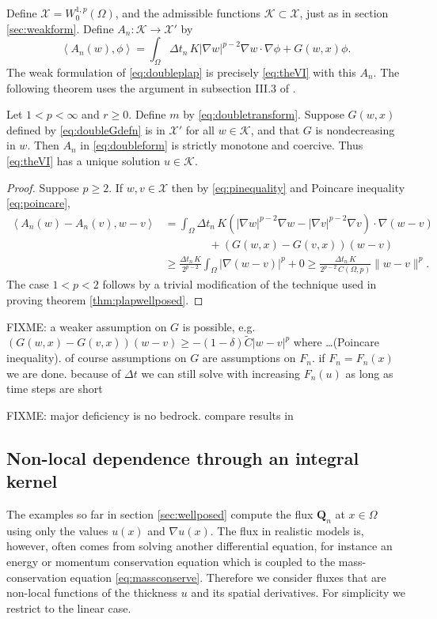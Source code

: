\documentclass[final,leqno,onefignum,onetabnum]{siamltex1213bueler}
\newcommand\bQ{\mathbf{Q}}
\renewcommand{\grad}{\nabla}
\newcommand{\ip}[2]{\ensuremath{\left<#1,#2\right>}}
\begin{document}
Define $\mathcal{X} = W_0^{1,p}(\Omega)$, and the admissible functions $\mathcal{K}\subset \mathcal{X}$, just as in section \ref{sec:weakform}.  Define $A_n: \mathcal{K} \to \mathcal{X}'$ by
\begin{equation}
\ip{A_n(w)}{\phi} = \int_\Omega \Delta t_n\, K |\grad w|^{p-2} \grad w\cdot \grad \phi + G(w,x)\phi. \label{eq:doubleform}
\end{equation}
The weak formulation of \eqref{eq:doubleplap} is precisely \eqref{eq:theVI} with this $A_n$.  The following theorem uses the argument in subsection III.3 of \cite{KinderlehrerStampacchia1980}.

\medskip
\begin{theorem}
Let $1<p<\infty$ and $r\ge 0$.  Define $m$ by \eqref{eq:doubletransform}.  Suppose $G(w,x)$ defined by \eqref{eq:doubleGdefn} is in $\mathcal{X}'$ for all $w\in\mathcal{K}$, and that $G$ is nondecreasing in $w$.  Then $A_n$ in \eqref{eq:doubleform} is strictly monotone and coercive.  Thus \eqref{eq:theVI} has a unique solution $u\in\mathcal{K}$.
\end{theorem}

\begin{proof}
Suppose $p\ge 2$.  If $w,v\in\mathcal{X}$ then by \eqref{eq:pinequality} and Poincare inequality \eqref{eq:poincare},
\begin{align*}
\ip{A_n(w)-A_n(v)}{w-v} &= \int_\Omega \Delta t_n\, K \left(|\grad w|^{p-2} \grad w - |\grad v|^{p-2} \grad v\right) \cdot \grad (w-v) \\
  &\qquad\qquad + \left(G(w,x) - G(v,x)\right) (w-v) \\
  &\ge \frac{\Delta t_n\,K}{2^{p-2}} \int_\Omega |\grad (w-v)|^p + 0 \ge \frac{\Delta t_n\,K}{2^{p-2}\, C(\Omega,p)} \|w-v\|^p.
\end{align*}
The case $1<p<2$ follows by a trivial modification of the technique used in proving theorem \ref{thm:plapwellposed}.
\end{proof}

FIXME: a weaker assumption on $G$ is possible, e.g.~$(G(w,x)-G(v,x))(w-v) \ge - (1-\delta) \tilde C |w-v|^p$ where \dots (Poincare inequality).  of course assumptions on $G$ are assumptions on $F_n$.  if $F_n=F_n(x)$ we are done. because of $\Delta t$ we can still solve with increasing $F_n(u)$ as long as time steps are short

FIXME: major deficiency is no bedrock. compare results in \cite{JouvetBueler2012}

\subsection{Non-local dependence through an integral kernel} \label{subsec:nonlocal}   The examples so far in section \ref{sec:wellposed} compute the flux $\bQ_n$ at $x\in\Omega$ using only the values $u(x)$ and $\grad u(x)$.  The flux in realistic models is, however, often comes from solving another differential equation, for instance an energy or momentum conservation equation which is coupled to the mass-conservation equation \eqref{eq:massconserve}.  Therefore we consider fluxes that are non-local functions of the thickness $u$ and its spatial derivatives.  For simplicity we restrict to the linear case.
\end{document}
